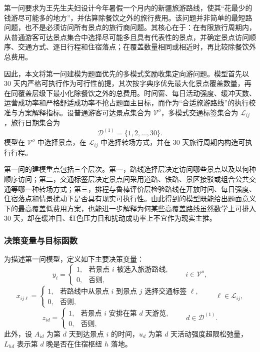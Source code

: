 \documentclass[UTF8,zihao=-4,a4paper]{ctexart}
\begin{document}
第一问要求为王先生夫妇设计今年暑假一个月内的新疆旅游路线，使其“花最少的钱游尽可能多的地方”，并估算除餐饮之外的旅行费用。该问题并非简单的最短路问题，也不是必须访问所有景点的旅行商问题。其核心在于：在有限旅行周期内，从普通游客可达景点集合中选择尽可能多且具有代表性的景点，并确定景点访问顺序、交通方式、逐日行程和住宿落点；在覆盖数量相同或相近时，再比较除餐饮外总费用。

因此，本文将第一问建模为题面优先的多模式奖励收集定向游问题。模型首先以 $30$ 天内严格可执行作为可行性前提，其次按字典序优先最大化景点覆盖数量，再在同覆盖层级下最小化除餐饮之外的总费用。时间窗、每日活动强度、缓冲天数、运营成功率和严格舒适成功率不抢占题面主目标，而作为“合适旅游路线”的执行校准与方案解释指标。设普通游客可达景点集合为 $\mathcal{V}^{o}$，多模式交通标签集合为 $\mathcal{L}_{ij}$，旅行日期集合为
\[
\mathcal{D}^{(1)}=\{1,2,\ldots,30\}.
\]
模型在 $\mathcal{V}^{o}$ 中选择景点，在 $\mathcal{L}_{ij}$ 中选择转场方式，并在 $30$ 天旅行周期内构造可执行行程。

第一问的建模重点包括三个层次。第一，路线选择层决定访问哪些景点以及以何种顺序访问；第二，交通标签层决定景点间采用道路、铁路、景区接驳或组合公共交通等哪一种转场方式；第三，排程与鲁棒评价层检验路线在开放时间、每日强度、住宿落点和情景扰动下是否具有现实可执行性。由此得到的模型既能给出题面意义下的最高覆盖低费用方案，也能进一步解释为何某些高覆盖路线虽然数学上可排入 $30$ 天，却在缓冲日、红色压力日和扰动成功率上不宜作为现实主推。

\subsubsection{决策变量与目标函数}
\label{subsubsec:q1_variables_objective}

为描述第一问模型，定义如下主要决策变量：
\[
y_i=
\begin{cases}
1, & \text{若景点 } i \text{ 被选入旅游路线},\\
0, & \text{否则},
\end{cases}
\qquad i\in\mathcal{V}^{o},
\]
\[
x_{ij\ell}=
\begin{cases}
1, & \text{若路线中从景点 } i \text{ 到景点 } j \text{ 选择交通标签 } \ell,\\
0, & \text{否则},
\end{cases}
\qquad \ell\in\mathcal{L}_{ij},
\]
\[
z_{id}=
\begin{cases}
1, & \text{若景点 } i \text{ 安排在第 } d \text{ 天游览},\\
0, & \text{否则},
\end{cases}
\qquad d\in\mathcal{D}^{(1)}.
\]
此外，设 $A_{id}$ 为第 $d$ 天到达景点 $i$ 的时间，$u_d$ 为第 $d$ 天活动强度超限松弛量，$L_{hd}$ 表示第 $d$ 晚是否在住宿枢纽 $h$ 落地。
\end{document}
